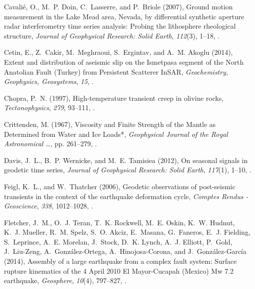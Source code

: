 \documentclass[draft,linenumbers]{AGUJournal}
\begin{document}
\begin{thebibliography}{52}
Cavali{\'{e}}, O., M.~P. Doin, C.~Lasserre, and P.~Briole (2007), {Ground
  motion measurement in the Lake Mead area, Nevada, by differential synthetic
  aperture radar interferometry time series analysis: Probing the lithosphere
  rheological structure}, \textit{Journal of Geophysical Research: Solid
  Earth}, \textit{112}(3), 1--18, .

Cetin, E., Z.~Cakir, M.~Meghraoui, S.~Ergintav, and A.~M. Akoglu (2014),
  {Extent and distribution of aseismic slip on the Ismetpasa segment of the
  North Anatolian Fault (Turkey) from Persistent Scatterer InSAR},
  \textit{Geochemistry, Geophysics, Geosystems}, \textit{15},
  .

Chopra, P.~N. (1997), {High-temperature transient creep in olivine rocks},
  \textit{Tectonophysics}, \textit{279}, 93--111,
  .

Crittenden, M. (1967), {Viscosity and Finite Strength of the Mantle as
  Determined from Water and Ice Loads*}, \textit{Geophysical Journal of the
  Royal Astronomical {\ldots}}, pp. 261--279,
  .

Davis, J.~L., B.~P. Wernicke, and M.~E. Tamisiea (2012), {On seasonal signals
  in geodetic time series}, \textit{Journal of Geophysical Research: Solid
  Earth}, \textit{117}(1), 1--10, .

Feigl, K.~L., and W.~Thatcher (2006), {Geodetic observations of post-seismic
  transients in the context of the earthquake deformation cycle},
  \textit{Comptes Rendus - Geoscience}, \textit{338}, 1012--1028,
  .

Fletcher, J.~M., O.~J. Teran, T.~K. Rockwell, M.~E. Oskin, K.~W. Hudnut, K.~J.
  Mueller, R.~M. Spelz, S.~O. Akciz, E.~Masana, G.~Faneros, E.~J. Fielding,
  S.~Leprince, A.~E. Morelan, J.~Stock, D.~K. Lynch, A.~J. Elliott, P.~Gold,
  J.~Liu-Zeng, A.~Gonz{\'{a}}lez-Ortega, A.~Hinojosa-Corona, and
  J.~Gonz{\'{a}}lez-Garc{\'{i}}a (2014), {Assembly of a large earthquake from a
  complex fault system: Surface rupture kinematics of the 4 April 2010 El
  Mayor-Cucapah (Mexico) Mw 7.2 earthquake}, \textit{Geosphere},
  \textit{10}(4), 797--827, .


\end{thebibliography}
\end{document}
